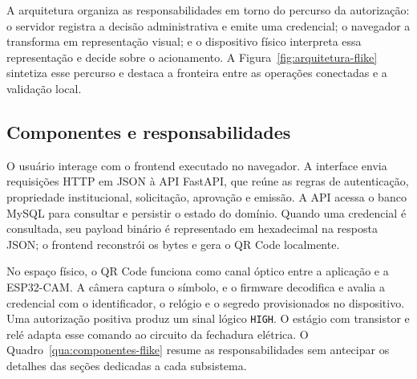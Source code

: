 A arquitetura organiza as responsabilidades em torno do percurso da autorização: o servidor registra a decisão administrativa e emite uma credencial; o navegador a transforma em representação visual; e o dispositivo físico interpreta essa representação e decide sobre o acionamento. A Figura~\ref{fig:arquitetura-flike} sintetiza esse percurso e destaca a fronteira entre as operações conectadas e a validação local.

\subsection{Componentes e responsabilidades}

O usuário interage com o frontend executado no navegador. A interface envia requisições HTTP em JSON à API FastAPI, que reúne as regras de autenticação, propriedade institucional, solicitação, aprovação e emissão. A API acessa o banco MySQL para consultar e persistir o estado do domínio. Quando uma credencial é consultada, seu payload binário é representado em hexadecimal na resposta JSON; o frontend reconstrói os bytes e gera o QR Code localmente.

No espaço físico, o QR Code funciona como canal óptico entre a aplicação e a ESP32-CAM. A câmera captura o símbolo, e o firmware decodifica e avalia a credencial com o identificador, o relógio e o segredo provisionados no dispositivo. Uma autorização positiva produz um sinal lógico \texttt{HIGH}. O estágio com transistor e relé adapta esse comando ao circuito da fechadura elétrica. O Quadro~\ref{qua:componentes-flike} resume as responsabilidades sem antecipar os detalhes das seções dedicadas a cada subsistema.

